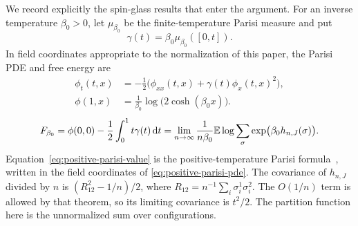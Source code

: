 We record explicitly the spin-glass results that enter the argument.
For an inverse temperature $\beta_0>0$, let $\mu_{\beta_0}$ be the
finite-temperature Parisi measure and put
\[
 \gamma(t)=\beta_0\mu_{\beta_0}([0,t]).
\]
In field coordinates appropriate to the normalization of this paper,
the Parisi PDE and free energy are
\begin{equation}
 \begin{aligned}
 \phi_t(t,x)
   &=-\frac12\bigl(\phi_{xx}(t,x)+\gamma(t)\phi_x(t,x)^2\bigr),\\
 \phi(1,x)&=\frac1{\beta_0}\log\bigl(2\cosh(\beta_0x)\bigr).
 \end{aligned}
 \label{eq:positive-parisi-pde}
\end{equation}
\begin{equation}
 F_{\beta_0}
   =\phi(0,0)-\frac12\int_0^1t\gamma(t)\,\mathrm d t
    =\lim_{n\to\infty}\frac1{n\beta_0}
        \mathbb E\log\sum_{\sigma}\exp\bigl(\beta_0h_{n,J}(\sigma)\bigr).
 \label{eq:positive-parisi-value}
\end{equation}
Equation~\eqref{eq:positive-parisi-value} is the positive-temperature
Parisi formula~\cite[Theorem~1.1]{Talagrand2006}, written in the field
coordinates of \eqref{eq:positive-parisi-pde}. The covariance of
$h_{n,J}$ divided by $n$ is $(R_{12}^2-1/n)/2$, where
$R_{12}=n^{-1}\sum_i\sigma_i^1\sigma_i^2$. The $O(1/n)$ term is
allowed by that theorem, so its limiting covariance is $t^2/2$.
The partition function here is the unnormalized sum over configurations.

